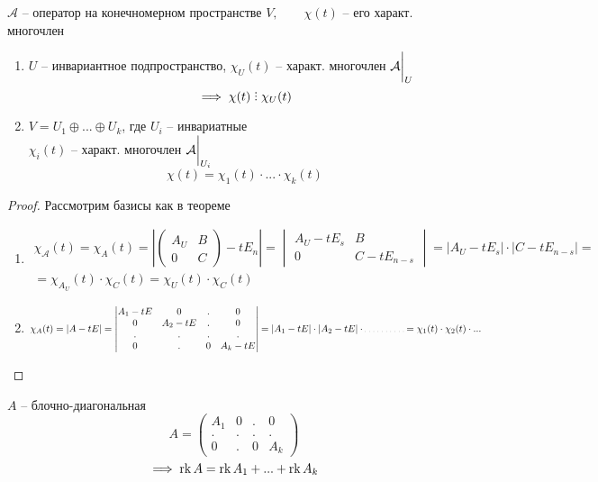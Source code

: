 \begin{implication}
	$ \mathcal{A} $ -- оператор на конечномерном пространстве $ V, \qquad \chi(t) $ -- его характ. многочлен
	\begin{enumerate}
		\item $ U $ -- инвариантное подпространство, $ \chi_U(t) $ -- характ. многочлен $ \mathcal{A}\bigg|_{U}^{} $
		$$ \implies \chi(t) \divby \chi_U(t) $$
		\item $ V = U_1 \oplus ... \oplus U_k $, где $ U_i $ -- инвариатные \\
		$ \chi_i(t) $ -- характ. многочлен $ \mathcal{A}\bigg|_{U_i}^{} $
		$$ \chi(t) = \chi_1(t) \cdot ... \cdot \chi_k(t) $$
	\end{enumerate}
\end{implication}

\begin{proof}
	Рассмотрим базисы как в теореме
	\begin{enumerate}
		\item
		\begin{multline*}
			\chi_{\mathcal{A}}(t) = \chi_A(t) = \left|
			\begin{pmatrix}
				A_U & B \\
				0 & C
			\end{pmatrix} - t E_n \right| =
			\begin{vmatrix}
				A_U - t E_s & B \\
				0 & C - t E_{n - s}
			\end{vmatrix} = |A_U - t E_s | \cdot | C - t E_{n -s} | = \\
			= \chi_{A_U}(t) \cdot \chi_C(t) = \chi_U(t) \cdot \chi_C(t)
		\end{multline*}
		\item
		$$ \chi_A(t) = |A - tE| =
		\begin{vmatrix}
			A_1 - tE & 0 & . & 0 \\
			0 & A_2 - tE & . & 0 \\
			. & . & . & . \\
			0 & . & 0 & A_k - tE
		\end{vmatrix} = |A_1 - tE| \cdot |A_2 - tE| \cdot \widedots[4em] = \chi_1(t) \cdot \chi_2(t) \cdot ... $$
	\end{enumerate}
\end{proof}

\begin{lemma}
	$ A $ -- блочно-диагональная
	$$ A =
	\begin{pmatrix}
		A_1 & 0 & . & 0 \\
		. & . & . & . \\
		0 & . & 0 & A_k
	\end{pmatrix} $$
	$$ \implies \operatorname{rk} A = \operatorname{rk} A_1 + ... + \operatorname{rk} A_k $$
\end{lemma}

